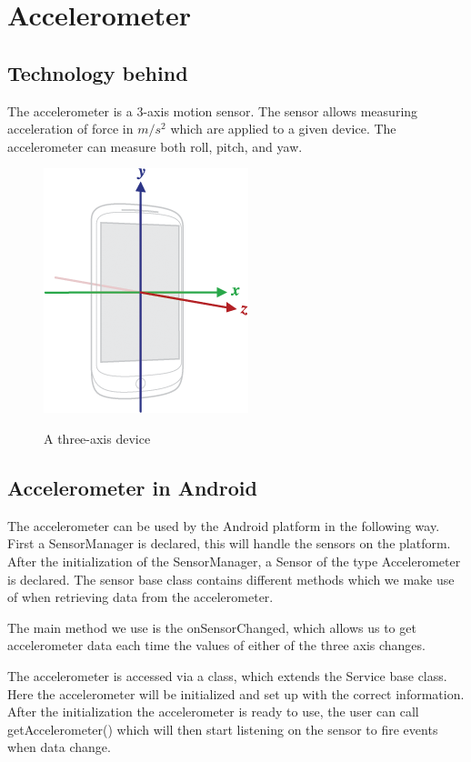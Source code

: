 \section{Accelerometer}

\subsection{Technology behind}
\label{sec:accl}
The accelerometer is a $3$-axis motion sensor. The sensor allows measuring acceleration of force in $m/s^2$ which are applied to a given device. The accelerometer can measure both roll, pitch, and yaw.

\begin{figure}[ht]
\begin{center}
 \label{fig:three-axis}
 \includegraphics[scale=0.4]{img/axis_device.png}
\caption{A three-axis device}
\end{center}
\end{figure}

\subsection{Accelerometer in Android}
The accelerometer can be used by the Android platform in the following way. First a SensorManager is declared, this will handle the sensors on the platform.
After the initialization of the SensorManager, a Sensor of the type Accelerometer is declared.
The sensor base class contains different methods which we make use of when retrieving data from the accelerometer.

The main method we use is the onSensorChanged, which allows us to get accelerometer data each time the values of either of the three axis changes.

The accelerometer is accessed via a class, which extends the Service base class.
Here the accelerometer will be initialized and set up with the correct information.
After the initialization the accelerometer is ready to use, the user can call getAccelerometer() which will then start listening on the sensor to fire events when data change.

